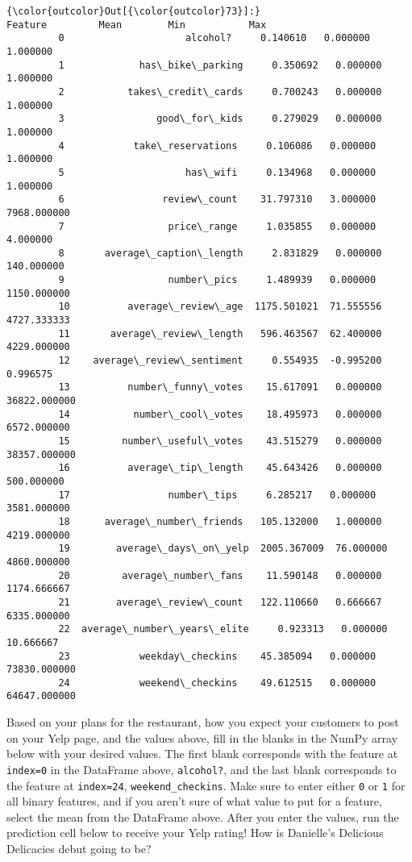 \documentclass[11pt]{article}
\begin{document}
\begin{Verbatim}[commandchars=\\\{\}]
{\color{outcolor}Out[{\color{outcolor}73}]:}                        Feature         Mean        Min           Max
         0                     alcohol?     0.140610   0.000000      1.000000
         1             has\_bike\_parking     0.350692   0.000000      1.000000
         2           takes\_credit\_cards     0.700243   0.000000      1.000000
         3                good\_for\_kids     0.279029   0.000000      1.000000
         4            take\_reservations     0.106086   0.000000      1.000000
         5                     has\_wifi     0.134968   0.000000      1.000000
         6                 review\_count    31.797310   3.000000   7968.000000
         7                  price\_range     1.035855   0.000000      4.000000
         8       average\_caption\_length     2.831829   0.000000    140.000000
         9                  number\_pics     1.489939   0.000000   1150.000000
         10          average\_review\_age  1175.501021  71.555556   4727.333333
         11       average\_review\_length   596.463567  62.400000   4229.000000
         12    average\_review\_sentiment     0.554935  -0.995200      0.996575
         13          number\_funny\_votes    15.617091   0.000000  36822.000000
         14           number\_cool\_votes    18.495973   0.000000   6572.000000
         15         number\_useful\_votes    43.515279   0.000000  38357.000000
         16          average\_tip\_length    45.643426   0.000000    500.000000
         17                 number\_tips     6.285217   0.000000   3581.000000
         18      average\_number\_friends   105.132000   1.000000   4219.000000
         19        average\_days\_on\_yelp  2005.367009  76.000000   4860.000000
         20         average\_number\_fans    11.590148   0.000000   1174.666667
         21        average\_review\_count   122.110660   0.666667   6335.000000
         22  average\_number\_years\_elite     0.923313   0.000000     10.666667
         23            weekday\_checkins    45.385094   0.000000  73830.000000
         24            weekend\_checkins    49.612515   0.000000  64647.000000
\end{Verbatim}
            
    Based on your plans for the restaurant, how you expect your customers to
post on your Yelp page, and the values above, fill in the blanks in the
NumPy array below with your desired values. The first blank corresponds
with the feature at \texttt{index=0} in the DataFrame above,
\texttt{alcohol?}, and the last blank corresponds to the feature at
\texttt{index=24}, \texttt{weekend\_checkins}. Make sure to enter either
\texttt{0} or \texttt{1} for all binary features, and if you aren't sure
of what value to put for a feature, select the mean from the DataFrame
above. After you enter the values, run the prediction cell below to
receive your Yelp rating! How is Danielle's Delicious Delicacies debut
going to be?
\end{document}

